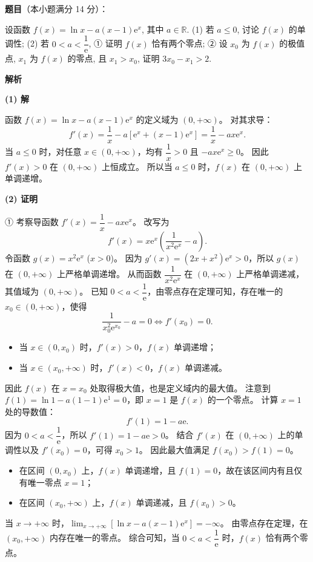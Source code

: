 \begin{answer}

\textbf{题目}（本小题满分 14 分）：

设函数 $f(x) = \ln x - a(x - 1)\mathrm{e}^x$, 其中 $a \in \mathbb{R}$.
(1) 若 $a \leqslant 0$, 讨论 $f(x)$ 的单调性;
(2) 若 $0 < a < \dfrac{1}{\mathrm{e}}$,
① 证明 $f(x)$ 恰有两个零点;
② 设 $x_0$ 为 $f(x)$ 的极值点, $x_1$ 为 $f(x)$ 的零点, 且 $x_1 > x_0$, 证明 $3x_0 - x_1 > 2$.

\textbf{解析}

\textbf{(1) 解}

函数 $f(x) = \ln x - a(x - 1)\mathrm{e}^x$ 的定义域为 $(0, +\infty)$。
对其求导：
\nopagebreak[4]
\[f'(x) = \frac{1}{x} - a\left[\mathrm{e}^x + (x - 1)\mathrm{e}^x\right] = \frac{1}{x} - ax\mathrm{e}^x.\]
当 $a \leqslant 0$ 时，对任意 $x \in (0, +\infty)$，均有 $\dfrac{1}{x} > 0$ 且 $-ax\mathrm{e}^x \geqslant 0$。
因此 $f'(x) > 0$ 在 $(0, +\infty)$ 上恒成立。
所以当 $a \leqslant 0$ 时，$f(x)$ 在 $(0, +\infty)$ 上单调递增。

\textbf{(2) 证明}

① 考察导函数 $f'(x) = \dfrac{1}{x} - ax\mathrm{e}^x$。
改写为
\nopagebreak[4]
\[f'(x) = x\mathrm{e}^x\left(\frac{1}{x^2\mathrm{e}^x} - a\right).\]
令函数 $g(x) = x^2\mathrm{e}^x$ ($x > 0$)。
因为 $g'(x) = (2x + x^2)\mathrm{e}^x > 0$，所以 $g(x)$ 在 $(0, +\infty)$ 上严格单调递增。
从而函数 $\dfrac{1}{x^2\mathrm{e}^x}$ 在 $(0, +\infty)$ 上严格单调递减，其值域为 $(0, +\infty)$。
已知 $0 < a < \dfrac{1}{\mathrm{e}}$，由零点存在定理可知，存在唯一的 $x_0 \in (0, +\infty)$，使得
\nopagebreak[4]
\[\frac{1}{x_0^2\mathrm{e}^{x_0}} - a = 0 \iff f'(x_0) = 0.\]
\begin{itemize}
\item 当 $x \in (0, x_0)$ 时，$f'(x) > 0$，$f(x)$ 单调递增；
\item 当 $x \in (x_0, +\infty)$ 时，$f'(x) < 0$，$f(x)$ 单调递减。
\end{itemize}
因此 $f(x)$ 在 $x = x_0$ 处取得极大值，也是定义域内的最大值。
注意到 $f(1) = \ln 1 - a(1 - 1)\mathrm{e}^1 = 0$，即 $x = 1$ 是 $f(x)$ 的一个零点。
计算 $x = 1$ 处的导数值：
\nopagebreak[4]
\[f'(1) = 1 - a\mathrm{e}.\]
因为 $0 < a < \dfrac{1}{\mathrm{e}}$，所以 $f'(1) = 1 - a\mathrm{e} > 0$。
结合 $f'(x)$ 在 $(0, +\infty)$ 上的单调性以及 $f'(x_0) = 0$，可得 $x_0 > 1$。
因此最大值满足 $f(x_0) > f(1) = 0$。
\begin{itemize}
\item 在区间 $(0, x_0)$ 上，$f(x)$ 单调递增，且 $f(1) = 0$，故在该区间内有且仅有唯一零点 $x = 1$；
\item 在区间 $(x_0, +\infty)$ 上，$f(x)$ 单调递减，且 $f(x_0) > 0$。
\end{itemize}
  当 $x \to +\infty$ 时，$\lim_{x \to +\infty} \left[\ln x - a(x - 1)\mathrm{e}^x\right] = -\infty$。
  由零点存在定理，在 $(x_0, +\infty)$ 内存在唯一的零点。
综合可知，当 $0 < a < \dfrac{1}{\mathrm{e}}$ 时，$f(x)$ 恰有两个零点。


\end{answer}
